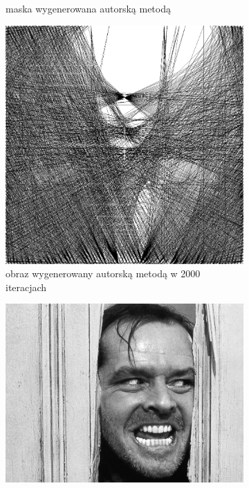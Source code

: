 \documentclass[a4paper, 12pt, polish, twoside]{extreport}
\begin{document}
\begin{figure}[H]
\begin{subfigure}{0.32\textwidth}
        \caption{maska wygenerowana autorską metodą}
        \label{comp-comp-joker-shining-b}
    \end{subfigure}
    \begin{subfigure}{0.32\textwidth}
        \centering
        \includegraphics[width = \textwidth]{img/6-comp/joker_r_i2000_c20_inv0_bg10_obj5_ed5.png}
        \caption{obraz wygenerowany autorską metodą w 2000 iteracjach}
        \label{comp-comp-joker-shining-c}
    \end{subfigure}
    \begin{subfigure}{0.24\textwidth}
        \centering
        \includegraphics[width = \textwidth]{img/6-comp/shining_original_c10_inv0.png}

\end{subfigure}
\end{figure}
\end{document}
